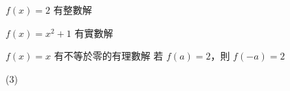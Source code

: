\begin{QUESTIONS}
\begin{QUESTION}
\begin{QBODY}
\begin{QOPS}
				\QOP $f(x)=2$ 有整數解

				\QOP $f(x)=x^2+1$ 有實數解

				\QOP  $f(x) = x$ 有不等於零的有理數解 
				\QOP 若 $f(a)=2$，則 $f(-a)=2$
			\end{QOPS}
        \end{QBODY}
        \begin{QFROMS}
        \end{QFROMS}
        \begin{QTAGS}\end{QTAGS}
        \begin{QANS}
            (3)
        \end{QANS}
        \begin{QSOLLIST}
        \end{QSOLLIST}
        \begin{QEMPTYSPACE}
        \end{QEMPTYSPACE}
    \end{QUESTION}
\end{QUESTIONS}
